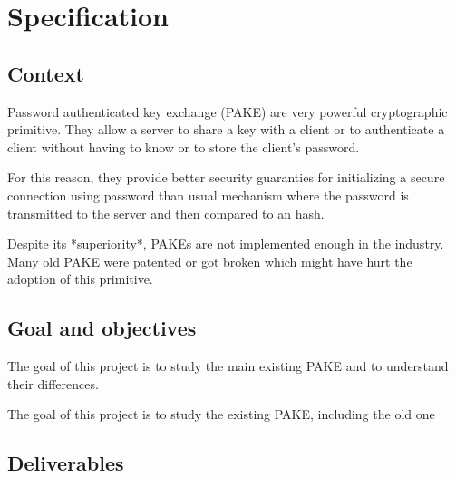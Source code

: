 \documentclass[../report.tex]{subfiles}
\begin{document}
\chapter{Specification}
\section*{Context}






Password authenticated key exchange (PAKE) are very powerful cryptographic primitive. They allow a server to share a key with a client or to authenticate a client without having to know or to store the client's password.

For this reason, they provide better security guaranties for initializing a secure connection using password than usual mechanism where the password is transmitted to the server and then compared to an hash.

Despite its *superiority*, PAKEs are not implemented enough in the industry. Many old PAKE were patented or got broken which might have hurt the adoption of this primitive.


\section*{Goal and objectives}

The goal of this project is to study the main existing PAKE and to understand their differences.

The goal of this project is to study the existing PAKE, including the old one







\section*{Deliverables}

\end{document}
